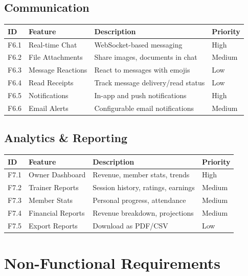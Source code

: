 \documentclass[
  12pt,
  a4paperpaper,
]{report}
\newcounter{none} %
\begin{document}
\subsection{Communication}\label{communication}

{\def\LTcaptype{none} %
\begin{longtable}[]{@{}llll@{}}
\hline
ID & Feature & Description & Priority \\
\hline
\endhead
\hline
\endlastfoot
F6.1 & Real-time Chat & WebSocket-based messaging & High \\
F6.2 & File Attachments & Share images, documents in chat & Medium \\
F6.3 & Message Reactions & React to messages with emojis & Low \\
F6.4 & Read Receipts & Track message delivery/read status & Low \\
F6.5 & Notifications & In-app and push notifications & High \\
F6.6 & Email Alerts & Configurable email notifications & Medium \\
\end{longtable}
}

\medskip\nopagebreak
{}
\subsection{Analytics \& Reporting}
\label{analytics-reporting}

{\def\LTcaptype{none} %
\begin{longtable}[]{@{}llll@{}}
\hline
ID & Feature & Description & Priority \\
\hline
\endhead
\hline
\endlastfoot
F7.1 & Owner Dashboard & Revenue, member stats, trends & High \\
F7.2 & Trainer Reports & Session history, ratings, earnings & Medium \\
F7.3 & Member Stats & Personal progress, attendance & Medium \\
F7.4 & Financial Reports & Revenue breakdown, projections & Medium \\
F7.5 & Export Reports & Download as PDF/CSV & Low \\
\end{longtable}
}


\section{Non-Functional Requirements}\label{non-functional-requirements}
\end{document}
